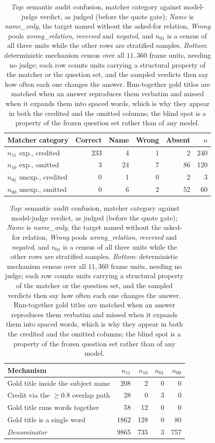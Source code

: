 \documentclass[10pt,twocolumn]{article}
\begin{document}
\begin{table}[tb]\centering\footnotesize
\caption{\emph{Top}: semantic audit confusion, matcher category against model-judge verdict, as
judged (before the quote gate); \emph{Name} is \emph{name\_only}, the target named without the
asked-for relation, \emph{Wrong} pools \emph{wrong\_relation}, \emph{reversed} and
\emph{negated}, and $n_{01}$ is a census of all three units while the other rows are stratified
samples. \emph{Bottom}: deterministic mechanism census over all $11{,}360$ frame units, needing no
judge; each row counts units carrying a structural property of the matcher or the question set, and
the sampled verdicts then say how often each one changes the answer. Run-together gold titles are
matched when an answer reproduces them verbatim and missed when it expands them into spaced words,
which is why they appear in both the credited and the omitted columns; the blind spot is a property
of the frozen question set rather than of any model.}
\label{tab:audit}
\setlength{\tabcolsep}{3.2pt}
\begin{tabular}{lrrrrr}
\toprule
Matcher category & Correct & Name & Wrong & Absent & $n$ \\
\midrule
$n_{11}$ exp., credited   & 233 &  4 & 1 &  2 & 240 \\
$n_{10}$ exp., omitted    &   3 & 24 & 7 & 86 & 120 \\
$n_{01}$ unexp., credited &   0 &  1 & 0 &  2 &   3 \\
$n_{00}$ unexp., omitted  &   0 &  6 & 2 & 52 &  60 \\
\bottomrule
\end{tabular}

\vspace{4pt}
\setlength{\tabcolsep}{3.2pt}
\begin{tabular}{lrrrr}
\toprule
Mechanism & $n_{11}$ & $n_{10}$ & $n_{01}$ & $n_{00}$ \\
\midrule
Gold title inside the subject name & 208 &   2 & 0 &  0 \\
Credit via the $\geq0.8$ overlap path &  28 &   0 & 3 &  0 \\
Gold title runs words together     &  58 &  12 & 0 &  0 \\
Gold title is a single word        & 1862 & 128 & 0 & 80 \\
\midrule
\emph{Denominator}                 & 9865 & 735 & 3 & 757 \\
\bottomrule
\end{tabular}
\end{table}
\end{document}
